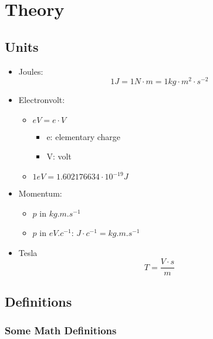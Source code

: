 \chapter{Theory}
\thumbforchapter{}
\chaptertoc{}

\section{Units}\label{units}

\begin{itemize}
\item
  Joules: \[1 J = 1 N \cdot m = 1 kg \cdot m^2 \cdot s^{-2}\]
\item
  Electronvolt:

  \begin{itemize}
  \tightlist
  \item
    \(eV = e \cdot V\)

    \begin{itemize}
    \tightlist
    \item
      e: elementary charge
    \item
      V: volt
    \end{itemize}
  \item
    \(1 eV = 1.602176634 \cdot 10^{-19} J\)
  \end{itemize}
\item
  Momentum:

  \begin{itemize}
  \tightlist
  \item
    \(p\) in \(kg.m.s^{-1}\)
  \item
    \(p\) in \(eV.c^{-1}\): \(J \cdot c^{-1} = kg.m.s^{-1}\)
  \end{itemize}
\item
  Tesla \[T = \frac{V \cdot s}{m}\]
\end{itemize}

\newpage

\hypertarget{definitions}{%
\section{Definitions}\label{definitions}}

\hypertarget{some-math-definitions}{%
\subsection{Some Math Definitions}\label{some-math-definitions}}

